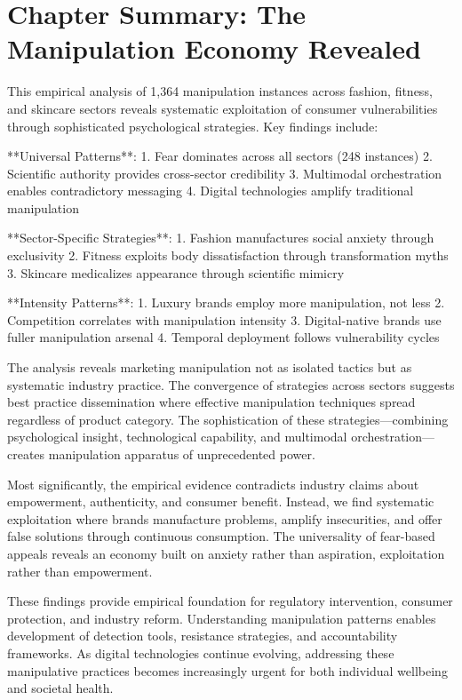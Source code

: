 \section{Chapter Summary: The Manipulation Economy Revealed}
\label{sec:empirical_summary}

This empirical analysis of 1,364 manipulation instances across fashion, fitness, and skincare sectors reveals systematic exploitation of consumer vulnerabilities through sophisticated psychological strategies. Key findings include:

**Universal Patterns**:
1. Fear dominates across all sectors (248 instances)
2. Scientific authority provides cross-sector credibility
3. Multimodal orchestration enables contradictory messaging
4. Digital technologies amplify traditional manipulation

**Sector-Specific Strategies**:
1. Fashion manufactures social anxiety through exclusivity
2. Fitness exploits body dissatisfaction through transformation myths
3. Skincare medicalizes appearance through scientific mimicry

**Intensity Patterns**:
1. Luxury brands employ more manipulation, not less
2. Competition correlates with manipulation intensity
3. Digital-native brands use fuller manipulation arsenal
4. Temporal deployment follows vulnerability cycles

The analysis reveals marketing manipulation not as isolated tactics but as systematic industry practice. The convergence of strategies across sectors suggests best practice dissemination where effective manipulation techniques spread regardless of product category. The sophistication of these strategies—combining psychological insight, technological capability, and multimodal orchestration—creates manipulation apparatus of unprecedented power.

Most significantly, the empirical evidence contradicts industry claims about empowerment, authenticity, and consumer benefit. Instead, we find systematic exploitation where brands manufacture problems, amplify insecurities, and offer false solutions through continuous consumption. The universality of fear-based appeals reveals an economy built on anxiety rather than aspiration, exploitation rather than empowerment.

These findings provide empirical foundation for regulatory intervention, consumer protection, and industry reform. Understanding manipulation patterns enables development of detection tools, resistance strategies, and accountability frameworks. As digital technologies continue evolving, addressing these manipulative practices becomes increasingly urgent for both individual wellbeing and societal health.